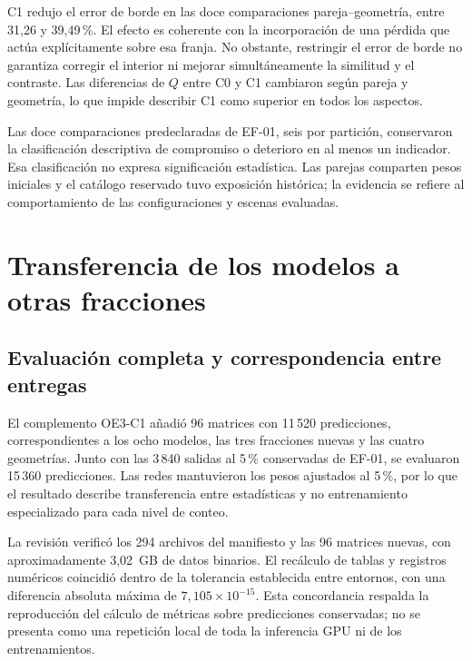 C1 redujo el error de borde en las doce comparaciones pareja--geometría, entre 31,26 y 39,49\,\%. El efecto es coherente con la incorporación de una pérdida que actúa explícitamente sobre esa franja. No obstante, restringir el error de borde no garantiza corregir el interior ni mejorar simultáneamente la similitud y el contraste. Las diferencias de $Q$ entre C0 y C1 cambiaron según pareja y geometría, lo que impide describir C1 como superior en todos los aspectos.

Las doce comparaciones predeclaradas de EF-01, seis por partición, conservaron la clasificación descriptiva de compromiso o deterioro en al menos un indicador. Esa clasificación no expresa significación estadística. Las parejas comparten pesos iniciales y el catálogo reservado tuvo exposición histórica; la evidencia se refiere al comportamiento de las configuraciones y escenas evaluadas.

\section{Transferencia de los modelos a otras fracciones}\label{sec:res-oe3}
\subsection{Evaluación completa y correspondencia entre entregas}
El complemento OE3-C1 añadió 96 matrices con 11\,520 predicciones, correspondientes a los ocho modelos, las tres fracciones nuevas y las cuatro geometrías. Junto con las 3\,840 salidas al 5\,\% conservadas de EF-01, se evaluaron 15\,360 predicciones. Las redes mantuvieron los pesos ajustados al 5\,\%, por lo que el resultado describe transferencia entre estadísticas y no entrenamiento especializado para cada nivel de conteo.

La revisión verificó los 294 archivos del manifiesto y las 96 matrices nuevas, con aproximadamente 3,02~GB de datos binarios. El recálculo de tablas y registros numéricos coincidió dentro de la tolerancia establecida entre entornos, con una diferencia absoluta máxima de $7{,}105\times10^{-15}$. Esta concordancia respalda la reproducción del cálculo de métricas sobre predicciones conservadas; no se presenta como una repetición local de toda la inferencia GPU ni de los entrenamientos.

